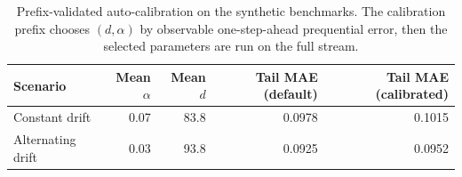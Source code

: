 \begin{table}[!htbp]
\centering
\small
\caption{Prefix-validated auto-calibration on the synthetic benchmarks. The calibration prefix chooses $(d,\alpha)$ by observable one-step-ahead prequential error, then the selected parameters are run on the full stream.}
\label{tab:zeta_autocalibration}
\begin{tabular}{lrrrr}
\toprule
Scenario & Mean $\alpha$ & Mean $d$ & Tail MAE (default) & Tail MAE (calibrated) \\
\midrule
Constant drift & 0.07 & 83.8 & 0.0978 & 0.1015 \\
Alternating drift & 0.03 & 93.8 & 0.0925 & 0.0952 \\
\bottomrule
\end{tabular}
\end{table}
